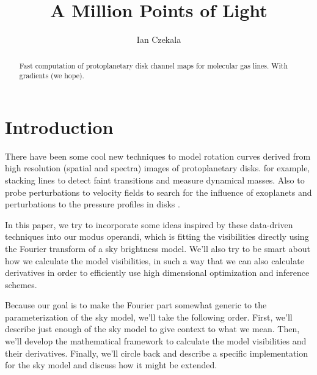 \documentclass[modern]{aastex62}
\begin{document}
\title{A Million Points of Light}


\author[0000-0002-1483-8811]{Ian Czekala}


\begin{abstract}
Fast computation of protoplanetary disk channel maps for molecular gas lines. With gradients (we hope).
\end{abstract}


\section{Introduction} \label{sec:intro}

There have been some cool new techniques to model rotation curves derived from high resolution (spatial and spectra) images of protoplanetary disks. for example, \citet{yen16,yen18} stacking lines to detect faint transitions and measure dynamical masses. Also to probe perturbations to velocity fields to search for the influence of exoplanets \citet{teague18a} and perturbations to the pressure profiles in disks \citet{teague18c}.

In this paper, we try to incorporate some ideas inspired by these data-driven techniques into our modus operandi, which is fitting the visibilities directly using the Fourier transform of a sky brightness model. We'll also try to be smart about how we calculate the model visibilities, in such a way that we can also calculate derivatives in order to efficiently use high dimensional optimization and inference schemes.

Because our goal is to make the Fourier part somewhat generic to the parameterization of the sky model, we'll take the following order. First, we'll describe just enough of the sky model to give context to what we mean. Then, we'll develop the mathematical framework to calculate the model visibilities and their derivatives. Finally, we'll circle back and describe a specific implementation for the sky model and discuss how it might be extended.
\end{document}
